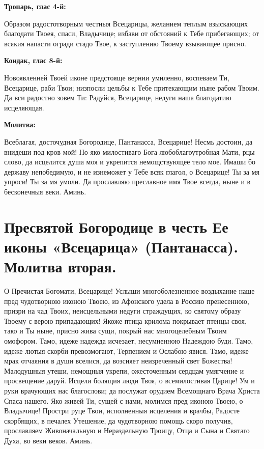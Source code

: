 \bfseries Тропарь, глас 4-й:\normalfont{}\nopagebreak


Образом радостотворным честныя Всецарицы, желанием теплым взыскающих благодати Твоея, спаси, Владычице; избави от обстояний к Тебе прибегающих; от всякия напасти огради стадо Твое, к заступлению Твоему взывающее присно.


\medskip


\bfseries Кондак, глас 8-й:\normalfont{}\nopagebreak


Новоявленней Твоей иконе предстояще вернии умиленно, воспеваем Ти, Всецарице, раби Твои; низпосли цельбы к Тебе притекающим ныне рабом Твоим. Да вси радостно зовем Ти: Радуйся, Всецарице, недуги наша благодатию исцеляющая.


\medskip


\bfseries Молитва:\normalfont{}\nopagebreak


Всеблагая, досточудная Богородице, Пантанасса, Всецарице! Несмь достоин, да внидеши под кров мой! Но яко милостиваго Бога любоблагоутробная Мати, рцы слово, да исцелится душа моя и укрепится немощствующее тело мое. Имаши бо державу непобедимую, и не изнеможет у Тебе всяк глагол, о Всецарице! Ты за мя упроси! Ты за мя умоли. Да прославляю преславное имя Твое всегда, ныне и в бесконечныя веки. Аминь.


\section{Пресвятой Богородице в честь Ее иконы «Всецарица» (Пантанасса). Молитва вторая.}
 


О Пречистая Богомати, Всецарице! Услыши многоболезненное воздыхание наше пред чудотворною иконою Твоею, из Афонского удела в Россию пренесенною, призри на чад Твоих, неисцельными недуги страждущих, ко святому образу Твоему с верою припадающих! Якоже птица крилома покрывает птенцы своя, тако и Ты ныне, присно жива сущи, покрый нас многоцелебным Твоим омофором. Тамо, идеже надежда исчезает, несумненною Надеждою буди. Тамо, идеже лютыя скорби превозмогают, Терпением и Ослабою явися. Тамо, идеже мрак отчаяния в души вселися, да возсияет неизреченный свет Божества! Малодушныя утеши, немощныя укрепи, ожесточенным сердцам умягчение и просвещение даруй. Исцели болящия люди Твоя, о всемилостивая Царице! Ум и руки врачующих нас благослови; да послужат орудием Всемощнаго Врача Христа Спаса нашего. Яко живей Ти, сущей с нами, молимся пред иконою Твоею, о Владычице! Простри руце Твои, исполненныя исцеления и врачбы, Радосте скорбящих, в печалех Утешение, да чудотворною помощь скоро получив, прославляем Живоначальную и Нераздельную Троицу, Отца и Сына и Святаго Духа, во веки веков. Аминь.


